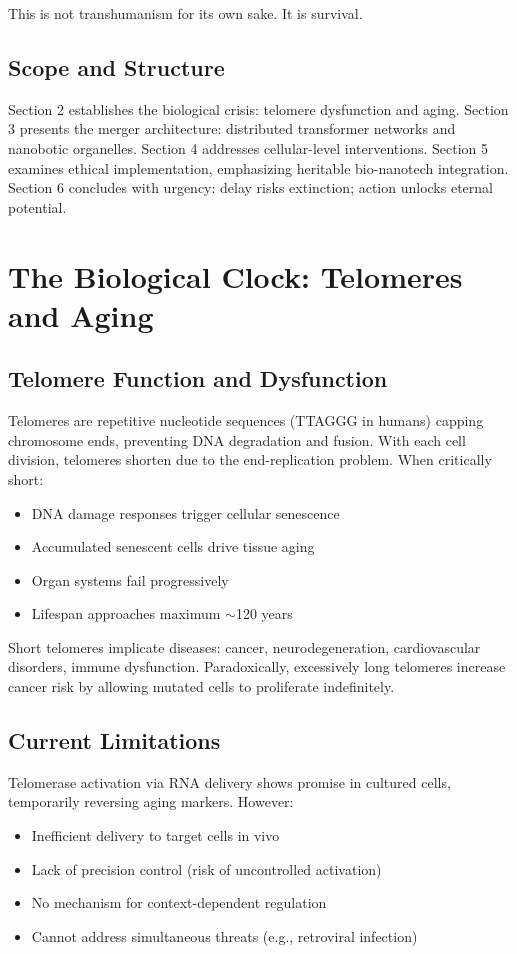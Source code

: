 \documentclass[reprint, amsmath, amssymb, aps, prd]{revtex4-2}
\begin{document}
This is not transhumanism for its own sake. It is survival.

\subsection{Scope and Structure}

Section 2 establishes the biological crisis: telomere dysfunction and aging. Section 3 presents the merger architecture: distributed transformer networks and nanobotic organelles. Section 4 addresses cellular-level interventions. Section 5 examines ethical implementation, emphasizing heritable bio-nanotech integration. Section 6 concludes with urgency: delay risks extinction; action unlocks eternal potential.

\section{The Biological Clock: Telomeres and Aging}

\subsection{Telomere Function and Dysfunction}

Telomeres are repetitive nucleotide sequences (TTAGGG in humans) capping chromosome ends, preventing DNA degradation and fusion. With each cell division, telomeres shorten due to the end-replication problem. When critically short:
\begin{itemize}
    \item DNA damage responses trigger cellular senescence
    \item Accumulated senescent cells drive tissue aging
    \item Organ systems fail progressively
    \item Lifespan approaches maximum $\sim$120 years
\end{itemize}

Short telomeres implicate diseases: cancer, neurodegeneration, cardiovascular disorders, immune dysfunction. Paradoxically, excessively long telomeres increase cancer risk by allowing mutated cells to proliferate indefinitely.

\subsection{Current Limitations}

Telomerase activation via RNA delivery shows promise in cultured cells, temporarily reversing aging markers. However:
\begin{itemize}
    \item Inefficient delivery to target cells in vivo
    \item Lack of precision control (risk of uncontrolled activation)
    \item No mechanism for context-dependent regulation
    \item Cannot address simultaneous threats (e.g., retroviral infection)
\end{itemize}
\end{document}
